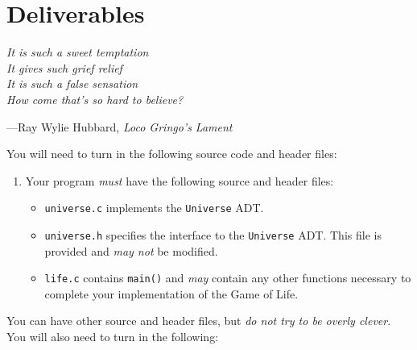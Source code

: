\section{Deliverables}

\textwidth
\epigraph{\emph{It is such a sweet temptation \\ It gives such grief relief \\
It is such a false sensation \\ How come that's so hard to believe?}}{---Ray
Wylie Hubbard, \emph{Loco Gringo's Lament}}

You will need to turn in the following source code and header files:

\begin{enumerate}
  \item Your program \emph{must} have the following source and header
    files:
  \begin{itemize}
    \item \texttt{universe.c} implements the \texttt{Universe} ADT.
    \item \texttt{universe.h} specifies the interface to the \texttt{Universe}
      ADT. This file is provided and \emph{may not} be modified.
    \item \texttt{life.c} contains \texttt{main()} and \emph{may}
      contain any other functions necessary to complete your implementation of
      the Game of Life.
  \end{itemize}
\end{enumerate}

You can have other source and header files, but \emph{do not try to be overly
clever}. You will also need to turn in the following:

